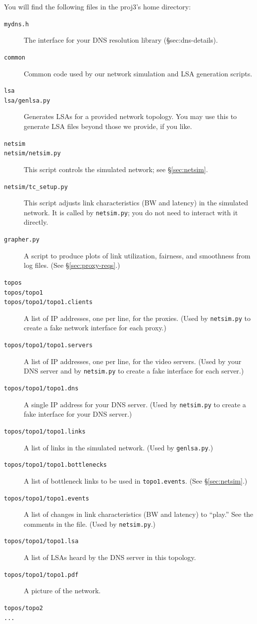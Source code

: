 \documentclass{article}
\begin{document}
You will find the following files in the proj3's home directory:
\begin{description}
	\item[\texttt{mydns.h}] The interface for your DNS resolution library (\S{sec:dns-details}).

	\item[\texttt{common}] Common code used by our network simulation and LSA generation scripts.

	\item[\texttt{lsa}]
	\item[\texttt{lsa/genlsa.py}] Generates LSAs for a provided network
	topology. You may use this to generate LSA files beyond those we provide,
	if you like.

	\item[\texttt{netsim}]
	\item[\texttt{netsim/netsim.py}] This script controls the simulated
	network; see \S\ref{sec:netsim}.
	\item[\texttt{netsim/tc\_setup.py}] This script adjusts link
	characteristics (BW and latency) in the simulated network. It is called by
	\texttt{netsim.py}; you do not need to interact with it directly.

	\item[\texttt{grapher.py}] A script to produce plots of link utilization, fairness, and smoothness from log files. (See \S\ref{sec:proxy-reqs}.)

	\item[\texttt{topos}]
	\item[\texttt{topos/topo1}]
	\item[\texttt{topos/topo1/topo1.clients}] A list of IP addresses, one per line, for the proxies. (Used by \texttt{netsim.py} to create a fake network interface for each proxy.)
	\item[\texttt{topos/topo1/topo1.servers}] A list of IP addresses, one per line, for the video servers. (Used by your DNS server and by \texttt{netsim.py} to create a fake interface for each server.)
	\item[\texttt{topos/topo1/topo1.dns}] A single IP address for your DNS server. (Used by \texttt{netsim.py} to create a fake interface for your DNS server.)
	\item[\texttt{topos/topo1/topo1.links}] A list of links in the simulated network. (Used by \texttt{genlsa.py}.)
	\item[\texttt{topos/topo1/topo1.bottlenecks}] A list of bottleneck links to be used in \texttt{topo1.events}. (See \S\ref{sec:netsim}.)
	\item[\texttt{topos/topo1/topo1.events}] A list of changes in link characteristics (BW and latency) to ``play.'' See the comments in the file. (Used by \texttt{netsim.py}.)
	\item[\texttt{topos/topo1/topo1.lsa}] A list of LSAs heard by the DNS server in this topology.
	\item[\texttt{topos/topo1/topo1.pdf}] A picture of the network.
	\item[\texttt{topos/topo2}]
	\item[\texttt{...}]

\end{description}
\end{document}
